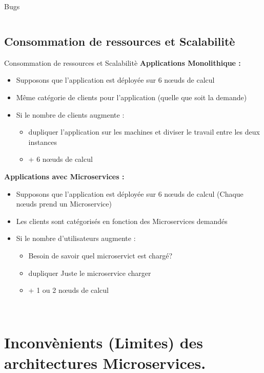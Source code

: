 \documentclass{beamer}
\begin{document}
\begin{frame}{Bugs}
\begin{columns}
    \end{columns}
    
\end{frame}
\subsection{Consommation de ressources et Scalabilit\`e}
\begin{frame}{Consommation de ressources et Scalabilit\`e}
        \textbf{Applications Monolithique :}
        \begin{itemize}
            \item Supposons que l'application est déployée sur \alert{6 nœuds} de calcul
            \item Même catégorie de clients pour l'application (quelle que soit la demande) 
            \item Si le nombre de clients augmente : 
                \begin{itemize}
                    \item dupliquer l'application sur les machines et diviser le travail entre les deux instances
                    \item + \alert{6 nœuds} de calcul
                \end{itemize}
        \end{itemize}
        \pause
        \textbf{Applications avec Microservices : }
        \begin{itemize}
            \item Supposons que l'application est déployée sur \alert{6 nœuds} de calcul \alert{(Chaque nœuds prend un Microservice)}
            \item Les clients sont catégorisés en fonction des Microservices demandés
            \item Si le nombre d'utilisateurs augmente : 
                \begin{itemize}
                    \item Besoin de savoir quel microservict est chargé?
                    \item dupliquer Juste le microservice charger
                    \item + \alert{1 ou 2 nœuds} de calcul
                \end{itemize}
        \end{itemize}
\
\end{frame}

\section{Inconv\`enients (Limites) des architectures Microservices.}
\end{document}
